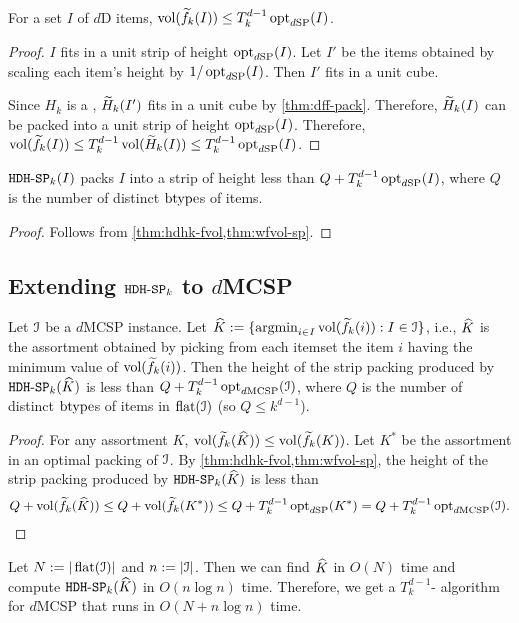 \begin{theorem}
\label{thm:wfvol-sp}
For a set $I$ of $d$D items, $\operatorname{vol}(\widetilde{f}_{k}(I)) \le T_k^{d-1} \operatorname{opt}_{d\mathrm{SP}}(I)$.
\end{theorem}
\begin{proof}
$I$ fits in a unit strip of height $\operatorname{opt}_{d\mathrm{SP}}(I)$.
Let $I'$ be the items obtained by scaling each item's height by $1/\operatorname{opt}_{d\mathrm{SP}}(I)$.
Then $I'$ fits in a unit cube.

Since $H_k$ is a \dff{}, $\widetilde{H}_{k}(I')$ fits in a unit cube by \cref{thm:dff-pack}.
Therefore, $\widetilde{H}_{k}(I)$ can be packed into a unit strip of height $\operatorname{opt}_{d\mathrm{SP}}(I)$.
Therefore, $\operatorname{vol}(\widetilde{f}_{k}(I)) \le T_k^{d-1}\operatorname{vol}(\widetilde{H}_{k}(I)) \le T_k^{d-1}\operatorname{opt}_{d\mathrm{SP}}(I)$.
\end{proof}

\begin{corollary}
\label{thm:hdhk-sp-appx}
$\operatorname{\mathtt{HDH-SP}}_{k}(I)$ packs $I$ into a strip of height less than $Q + T_k^{d-1}\operatorname{opt}_{d\mathrm{SP}}(I)$,
where $Q$ is the number of distinct $\operatorname{btype}$s of items.
\end{corollary}
\begin{proof} Follows from \cref{thm:hdhk-fvol,thm:wfvol-sp}. \end{proof}

\subsection{Extending \texorpdfstring{$\operatorname{\mathtt{HDH-SP}}_{k}$ to $d$MCSP}{HDH-SP to dMCSP}}
\label{sec:hdhk-mcsp}

\begin{theorem}
Let $\mathcal{I}$ be a $d$MCSP instance.
Let $\widehat{K} := \{\operatorname*{argmin}_{i \in I} \operatorname{vol}(\widetilde{f}_{k}(i)): I \in \mathcal{I}\}$,
i.e., $\widehat{K}$ is the assortment obtained by picking from each itemset
the item $i$ having the minimum value of $\operatorname{vol}(\widetilde{f}_{k}(i))$.
Then the height of the strip packing produced by $\operatorname{\mathtt{HDH-SP}}_{k}(\widehat{K})$
is less than $Q + T_k^{d-1}\operatorname{opt}_{d\mathrm{MCSP}}(\mathcal{I})$,
where $Q$ is the number of distinct $\operatorname{btype}$s of items in $\operatorname{flat}(\mathcal{I})$
(so $Q \le k^{d-1}$).
\end{theorem}
\begin{proof}
For any assortment $K$, $\operatorname{vol}(\widetilde{f}_{k}(\widehat{K})) \le \operatorname{vol}(\widetilde{f}_{k}(K))$.
Let $K^*$ be the assortment in an optimal packing of $\mathcal{I}$.
By \cref{thm:hdhk-fvol,thm:wfvol-sp}, the height of the strip packing produced by
$\operatorname{\mathtt{HDH-SP}}_{k}(\widehat{K})$ is less than
\[ Q + \operatorname{vol}(\widetilde{f}_{k}(\widehat{K}))
\le Q + \operatorname{vol}(\widetilde{f}_{k}(K^*))
\le Q + T_k^{d-1}\operatorname{opt}_{d\mathrm{SP}}(K^*)
= Q + T_k^{d-1}\operatorname{opt}_{d\mathrm{MCSP}}(\mathcal{I}).
\qedhere \]
\end{proof}

Let $N := |\operatorname{flat}(\mathcal{I})|$ and $n := |\mathcal{I}|$.
Then we can find $\widehat{K}$ in $O(N)$ time and compute $\operatorname{\mathtt{HDH-SP}}_{k}(\widehat{K})$ in $O(n\log n)$ time.
Therefore, we get a $T_k^{d-1}$-\asymAppx{} algorithm for $d$MCSP
that runs in $O(N + n\log n)$ time.
